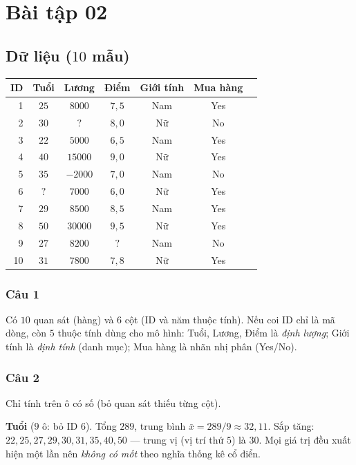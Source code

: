 \section*{Bài tập 02}

\subsection*{Dữ liệu ($10$ mẫu)}

\begin{center}
\small
\begin{tabular}{rcccccc}
ID & Tuổi & Lương & Điểm & Giới tính & Mua hàng\\\hline
1 & $25$ & $8000$ & $7{,}5$ & Nam & Yes \\
2 & $30$ & $?$ & $8{,}0$ & Nữ & No \\
3 & $22$ & $5000$ & $6{,}5$ & Nam & Yes \\
4 & $40$ & $15000$ & $9{,}0$ & Nữ & Yes \\
5 & $35$ & $-2000$ & $7{,}0$ & Nam & No \\
6 & $?$ & $7000$ & $6{,}0$ & Nữ & Yes \\
7 & $29$ & $8500$ & $8{,}5$ & Nam & Yes \\
8 & $50$ & $30000$ & $9{,}5$ & Nữ & Yes \\
9 & $27$ & $8200$ & $?$ & Nam & No \\
10 & $31$ & $7800$ & $7{,}8$ & Nữ & Yes \\
\end{tabular}
\end{center}

\subsubsection*{Câu 1}

Có $10$ quan sát (hàng) và $6$ cột (ID và năm thuộc tính). Nếu coi ID chỉ là mã dòng, còn $5$ thuộc tính dùng cho mô hình: Tuổi, Lương, Điểm là \emph{định lượng}; Giới tính là \emph{định tính} (danh mục); Mua hàng là nhãn nhị phân (Yes/No).

\subsubsection*{Câu 2}

Chỉ tính trên ô có số (bỏ quan sát thiếu từng cột).

\medskip
\textbf{Tuổi} ($9$ ô: bỏ ID $6$). Tổng $289$, trung bình $\bar x=289/9\approx 32{,}11$. Sắp tăng: $22,25,27,29,30,31,35,40,50$ --- trung vị (vị trí thứ $5$) là $30$. Mọi giá trị đều xuất hiện một lần nên \emph{không có mốt} theo nghĩa thống kê cổ điển.


